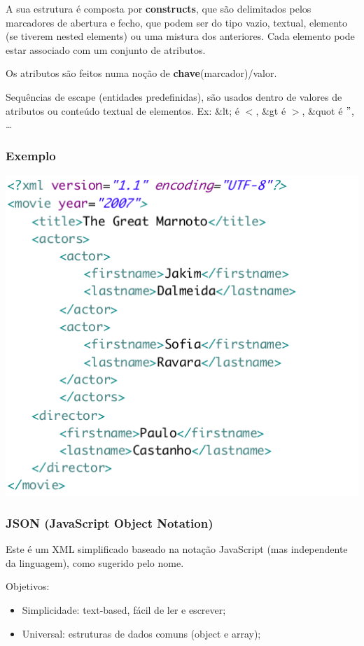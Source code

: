 \documentclass{article}
\begin{document}
A sua estrutura é composta por \textbf{constructs}, que são delimitados pelos marcadores de abertura
e fecho, que podem ser do tipo vazio, textual, elemento (se tiverem
nested elements) ou uma
mistura dos anteriores.
Cada elemento pode estar associado com um conjunto de atributos.

Os atributos são feitos numa noção de \textbf{chave}(marcador)/valor.

Sequências de escape (entidades predefinidas), são usados dentro de valores de atributos
ou conteúdo textual de elementos. Ex: \&lt; é $<$, \&gt é $>$, \&quot é $"$, \dots

\subsubsection*{Exemplo}

\begin{center}
  \includegraphics[scale=0.3]{55}
\end{center}

\subsubsection{JSON (JavaScript Object Notation)}

Este é um XML simplificado baseado na notação JavaScript (mas independente da linguagem), como sugerido pelo nome.

Objetivos:
\begin{itemize}
  \item Simplicidade: text-based, fácil de ler e escrever;
  \item Universal: estruturas de dados comuns (object e array);
\end{itemize}
\end{document}
